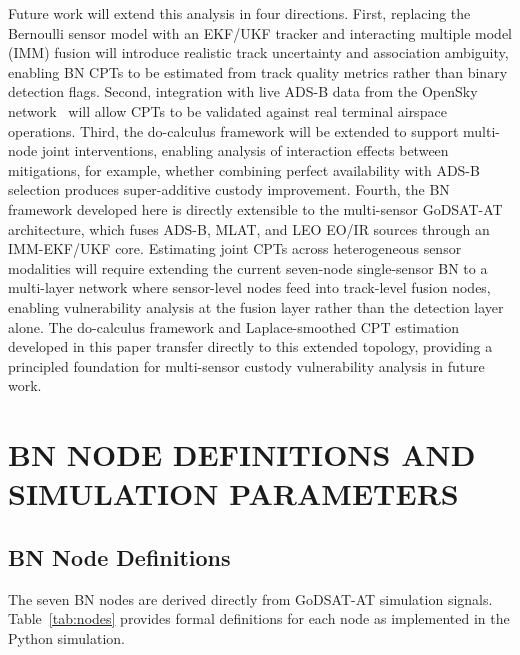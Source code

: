 \documentclass[]{spie}
\begin{document}
Future work will extend this analysis in four directions. First, replacing the Bernoulli sensor model with an EKF/UKF tracker and interacting multiple model (IMM) fusion will introduce realistic track uncertainty and association ambiguity, enabling BN CPTs to be estimated from track quality metrics rather than binary detection flags. Second, integration with live ADS-B data from the OpenSky network~\cite{opensky} will allow CPTs to be validated against real terminal airspace operations. Third, the do-calculus framework will be extended to support multi-node joint interventions, enabling analysis of interaction effects between mitigations, for example, whether combining perfect availability with ADS-B selection produces super-additive custody improvement. Fourth, the BN framework developed here is directly extensible to the multi-sensor GoDSAT-AT architecture, which fuses ADS-B, MLAT, and LEO EO/IR sources through an IMM-EKF/UKF core. Estimating joint CPTs across heterogeneous sensor modalities will require extending the current seven-node single-sensor BN to a multi-layer network where sensor-level nodes feed into track-level fusion nodes, enabling vulnerability analysis at the fusion layer rather than the detection layer alone. The do-calculus framework and Laplace-smoothed CPT estimation developed in this paper transfer directly to this extended topology, providing a principled foundation for multi-sensor custody vulnerability analysis in future work.

\appendix

\section{BN NODE DEFINITIONS AND SIMULATION PARAMETERS}
\label{sec:appendix}

\subsection{BN Node Definitions}

The seven BN nodes are derived directly from GoDSAT-AT simulation signals. Table~\ref{tab:nodes} provides formal definitions for each node as implemented in the Python simulation.
\end{document}
